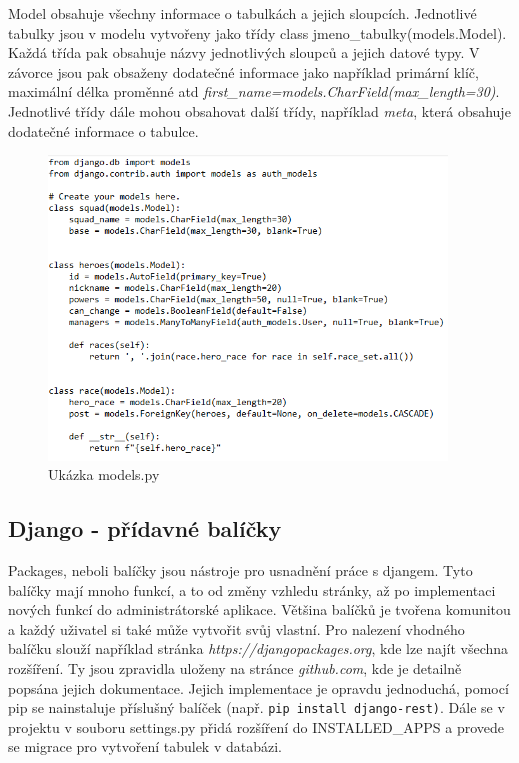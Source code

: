 Model obsahuje všechny informace o tabulkách a jejich
sloupcích. Jednotlivé tabulky jsou v modelu vytvořeny jako třídy class
jmeno\_tabulky(models.Model). Každá třída pak obsahuje názvy
jednotlivých sloupců a jejich datové typy. V závorce jsou pak obsaženy
dodatečné informace jako například primární klíč, maximální délka
proměnné atd
\textit{first\_name=models.CharField(max\_length=30)}. Jednotlivé
třídy dále mohou obsahovat další třídy, například \textit{meta}, která obsahuje
dodatečné informace o tabulce.

\vspace{15px}

\begin{figure}[H] \centering
    \includegraphics[width=300pt]{./pictures/2-model-example.png}
    \caption[Model příklad]{Ukázka models.py \cite{}}
	\label{fig:Ukázka models.py}                                
\end{figure}

\newpage

\subsection{Django - přídavné balíčky}

Packages, neboli balíčky jsou nástroje pro usnadnění práce s
djangem. Tyto balíčky mají mnoho funkcí, a to od změny vzhledu
stránky, až po implementaci nových funkcí do administrátorské aplikace. Většina
balíčků je tvořena komunitou a každý uživatel si také může vytvořit
svůj vlastní. Pro nalezení vhodného balíčku slouží například stránka
\textit{https://djangopackages.org}, kde lze najít všechna
rozšíření. Ty jsou zpravidla uloženy na stránce \textit{github.com}, kde
je detailně popsána jejich dokumentace. Jejich implementace je opravdu
jednoduchá, pomocí pip se nainstaluje příslušný balíček (např. {\tt pip
install django-rest)}. Dále se v projektu v souboru settings.py přidá
rozšíření do INSTALLED\_APPS a provede se migrace pro
vytvoření tabulek v databázi. \cite{django-packages}


